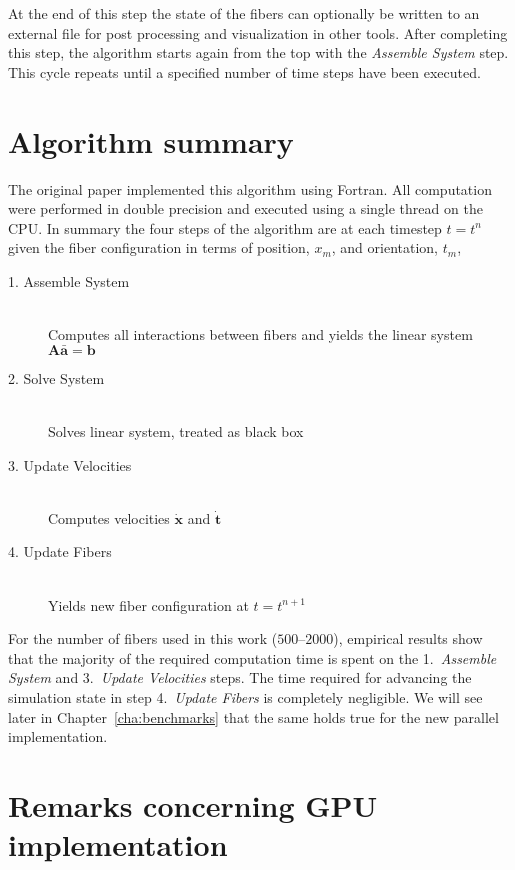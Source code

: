 At the end of this step the state of the fibers can optionally be written to an external file for post processing and visualization in other tools. After completing this step, the algorithm starts again from the top with the \emph{Assemble System} step. This cycle repeats until a specified number of time steps have been executed.

\section{Algorithm summary}
\label{sec:algorithm_summary}

The original paper implemented this algorithm using Fortran. All computation were performed in double precision and executed using a single thread on the CPU. In summary the four steps of the algorithm are at each timestep $t=t^n$ given the fiber configuration in terms of position, $x_m$, and orientation, $t_m$, 
\begin{description}
  \item[1. Assemble System] \hfill \\
Computes all interactions between fibers and yields the linear system ${\mathbf{A}\mathbf{\bar{a}}=\mathbf{b}}$
  \item[2. Solve System]  \hfill \\
Solves linear system, treated as black box
  \item[3. Update Velocities] \hfill \\
Computes velocities $\mathbf{\dot{x}}$ and $\mathbf{\dot{t}}$
  \item[4. Update Fibers] \hfill \\
Yields new fiber configuration at $t=t^{n+1}$
\end{description}

For the number of fibers used in this work ($500–2000$), empirical results show that the majority of the required computation time is spent on the 1.~\emph{Assemble System} and 3.~\emph{Update Velocities} steps. The time required for advancing the simulation state in step 4.~\emph{Update Fibers} is completely negligible. We will see later in Chapter~\ref{cha:benchmarks} that the same holds true for the new parallel implementation.

\section{Remarks concerning GPU implementation}

